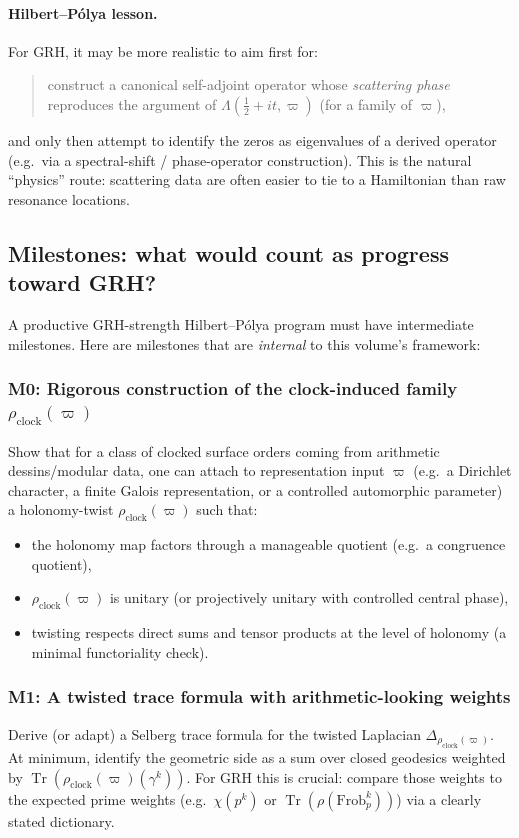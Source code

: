 \documentclass[11pt,oneside]{amsbook}
\numberwithin{equation}{section}
\theoremstyle{plain}
\theoremstyle{definition}
\theoremstyle{remark}
\DeclareMathOperator{\Tr}{\mathrm{Tr}}
\begin{document}
\paragraph{Hilbert--Pólya lesson.}
For GRH, it may be more realistic to aim first for:
\begin{quote}
construct a canonical self-adjoint operator whose \emph{scattering phase} reproduces the argument of $\Lambda(\tfrac12+it,\varpi)$ (for a family of $\varpi$),
\end{quote}
and only then attempt to identify the zeros as eigenvalues of a derived operator (e.g.\ via a spectral-shift / phase-operator construction).
This is the natural ``physics'' route: scattering data are often easier to tie to a Hamiltonian than raw resonance locations.

\subsection{Milestones: what would count as progress toward GRH?}
\label{sec:milestones_GRH}

A productive GRH-strength Hilbert--Pólya program must have intermediate milestones.
Here are milestones that are \emph{internal} to this volume's framework:

\subsubsection*{M0: Rigorous construction of the clock-induced family $\rho_{\mathrm{clock}}(\varpi)$}
Show that for a class of clocked surface orders coming from arithmetic dessins/modular data, one can attach to representation input $\varpi$ (e.g.\ a Dirichlet character, a finite Galois representation, or a controlled automorphic parameter) a holonomy-twist $\rho_{\mathrm{clock}}(\varpi)$ such that:
\begin{itemize}
\item the holonomy map factors through a manageable quotient (e.g.\ a congruence quotient),
\item $\rho_{\mathrm{clock}}(\varpi)$ is unitary (or projectively unitary with controlled central phase),
\item twisting respects direct sums and tensor products at the level of holonomy (a minimal functoriality check).
\end{itemize}

\subsubsection*{M1: A twisted trace formula with arithmetic-looking weights}
Derive (or adapt) a Selberg trace formula for the twisted Laplacian $\Delta_{\rho_{\mathrm{clock}}(\varpi)}$.
At minimum, identify the geometric side as a sum over closed geodesics weighted by $\Tr(\rho_{\mathrm{clock}}(\varpi)(\gamma^k))$.
For GRH this is crucial: compare those weights to the expected prime weights (e.g.\ $\chi(p^k)$ or $\Tr(\rho(\mathrm{Frob}_p^k))$) via a clearly stated dictionary.
\end{document}
